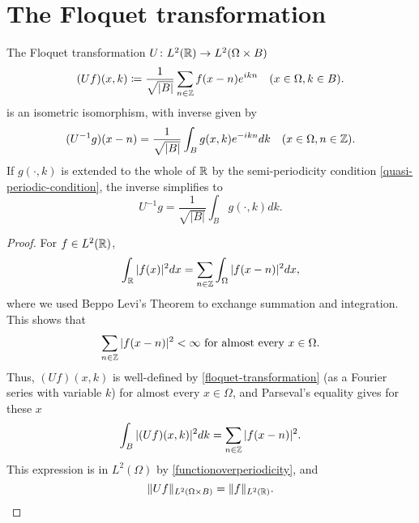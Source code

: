 \section{The Floquet transformation} 	
\begin{theorem} \label{3.2:thm-UIsometricIsomorphism}
	The Floquet transformation $U \colon L^{2}(\mathbb{R}) \rightarrow L^{2}(\Omega \times B)$ 
	\begin{equation}
		(Uf)(x, k) \coloneqq \frac{1}{\sqrt{|B|}} \sum_{n \in \mathbb{Z}} f(x - n) e^{ikn} \quad (x \in \Omega, k \in B). \label{floquet-transformation}
	\end{equation}
	is an isometric isomorphism, with inverse given by
		\begin{equation}
			(U^{-1}g)(x - n) = \frac{1}{\sqrt{|B|}} \int_{B} g(x, k) e^{-ikn} dk \quad (x \in \Omega, n \in \mathbb{Z}). \label{3.8}
		\end{equation} 
	If $g(\cdot, k)$ is extended to the whole of $\mathbb{R}$ by the semi-periodicity condition \eqref{quasi-periodic-condition}, the inverse simplifies to
		\begin{equation}
			U^{-1} g = \frac{1}{\sqrt{|B|}} \int_{B} g(\cdot, k) dk. \label{3.9}
		\end{equation}
		
	\begin{proof}
		For $f \in L^{2}(\mathbb{R})$,
		\begin{equation}
			\int_{\mathbb{R}} |f(x)|^{2} dx = \sum_{n \in \mathbb{Z}} \int_{\Omega} |f(x - n)|^{2} dx,\label{functionoverperiodicity}
		\end{equation} 
		where we used Beppo Levi's Theorem to exchange summation and integration. This shows that
		\[ \sum_{n \in \mathbb{Z}} |f(x - n)|^{2} < \infty \text{ for almost every } x \in \Omega.\]
		Thus, $(Uf)(x, k)$ is well-defined by \eqref{floquet-transformation} (as a Fourier series with variable $k$) for almost every $x \in \Omega$, and Parseval's equality gives for these $x$
		\[ \int_{B}|(Uf)(x,k)|^{2} dk = \sum_{n \in \mathbb{Z}} |f(x - n)|^{2}. \]
	 	This expression is in $L^{2}(\Omega)$ by \eqref{functionoverperiodicity}, and
		\[ \| Uf \|_{L^{2}(\Omega \times B)} = \|f\|_{L^{2}(\mathbb{R})}. \]
		

\end{proof}
\end{theorem}
